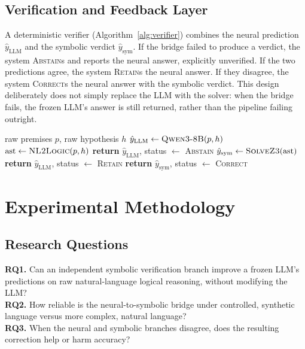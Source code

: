 \documentclass[conference]{IEEEtran}
\begin{document}
\subsection{Verification and Feedback Layer}
A deterministic verifier (Algorithm~\ref{alg:verifier}) combines the neural prediction $\hat y_{\text{LLM}}$ and the symbolic verdict $\hat y_{\text{sym}}$. If the bridge failed to produce a verdict, the system \textsc{Abstain}s and reports the neural answer, explicitly unverified. If the two predictions agree, the system \textsc{Retain}s the neural answer. If they disagree, the system \textsc{Correct}s the neural answer with the symbolic verdict. This design deliberately does not simply replace the LLM with the solver: when the bridge fails, the frozen LLM's answer is still returned, rather than the pipeline failing outright.

\begin{algorithm}[t]
\caption{NSCE verification and feedback}
\label{alg:verifier}
\begin{algorithmic}[1]
\REQUIRE raw premises $p$, raw hypothesis $h$
\STATE $\hat y_{\text{LLM}} \gets \textsc{Qwen3-8B}(p, h)$ 
\STATE $\text{ast} \gets \textsc{NL2Logic}(p, h)$ 
    \STATE \textbf{return} $\hat y_{\text{LLM}}$, status $\gets$ \textsc{Abstain}
\ENDIF
\STATE $\hat y_{\text{sym}} \gets \textsc{SolveZ3}(\text{ast})$ 
    \STATE \textbf{return} $\hat y_{\text{LLM}}$, status $\gets$ \textsc{Retain}
\ELSE
    \STATE \textbf{return} $\hat y_{\text{sym}}$, status $\gets$ \textsc{Correct}
\ENDIF
\end{algorithmic}
\end{algorithm}

\section{Experimental Methodology}

\subsection{Research Questions}
\textbf{RQ1.} Can an independent symbolic verification branch improve a frozen LLM's predictions on raw natural-language logical reasoning, without modifying the LLM?\\
\textbf{RQ2.} How reliable is the neural-to-symbolic bridge under controlled, synthetic language versus more complex, natural language?\\
\textbf{RQ3.} When the neural and symbolic branches disagree, does the resulting correction help or harm accuracy?
\end{document}
